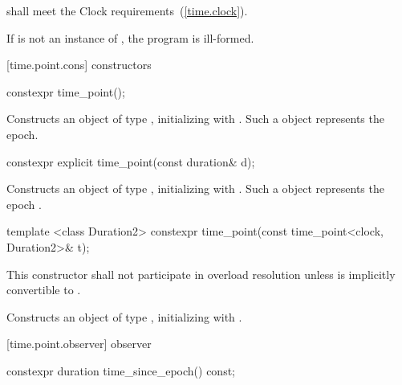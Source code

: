 \pnum
{} shall meet the Clock requirements~(\ref{time.clock}).

\pnum
If  is not an instance of ,
the program is ill-formed.

[time.point.cons]{ constructors}

%
\begin{itemdecl}
constexpr time_point();
\end{itemdecl}

\begin{itemdescr}
\pnum
\effects Constructs an object of type , initializing
 with . Such a  object
represents the epoch.
\end{itemdescr}

%
\begin{itemdecl}
constexpr explicit time_point(const duration& d);
\end{itemdecl}

\begin{itemdescr}
\pnum
\effects Constructs an object of type , initializing
 with . Such a  object represents the epoch
.
\end{itemdescr}

%
\begin{itemdecl}
template <class Duration2>
  constexpr time_point(const time_point<clock, Duration2>& t);
\end{itemdecl}

\begin{itemdescr}
\pnum
\remarks This constructor shall not participate in overload resolution unless 
is implicitly convertible to .

\pnum
\effects Constructs an object of type , initializing
 with .
\end{itemdescr}

[time.point.observer]{ observer}

%
%
\begin{itemdecl}
constexpr duration time_since_epoch() const;
\end{itemdecl}

